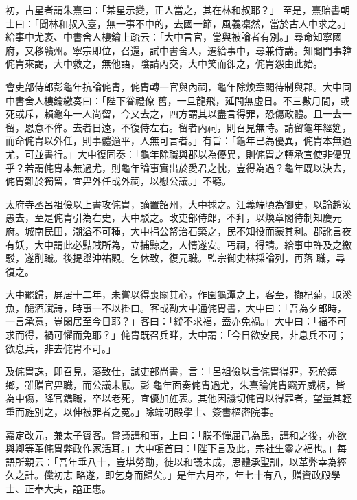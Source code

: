 \begin{pinyinscope}
 初，占星者謂朱熹曰：「某星示變，正人當之，其在林和叔耶？」
 至是，熹貽書朝士曰：「聞林和叔入臺，無一事不中的，去國一節，風義凜然，當於古人中求之。」給事中尤袤、中書舍人樓鑰上疏云：「大中言官，當與被論者有別。」尋命知寧國府，又移贛州。寧宗即位，召還，試中書舍人，遷給事中，尋兼侍講。知閣門事韓侂胄來謁，大中救之，無他語，陰請內交，大中笑而卻之，侂胄怨由此始。



 會吏部侍郎彭龜年抗論侂胄，侂胄轉一官與內祠，龜年除煥章閣待制與郡。大中同中書舍人樓鑰繳奏曰：「陛下眷禮僚
 舊，一旦龍飛，延問無虛日。不三數月間，或死或斥，賴龜年一人尚留，今又去之，四方謂其以盡言得罪，恐傷政體。且一去一留，恩意不侔。去者日遠，不復侍左右。留者內祠，則召見無時。請留龜年經筵，而命侂胄以外任，則事體適平，人無可言者。」有旨：「龜年已為優異，侂胄本無過尤，可並書行。」大中復同奏：「龜年除職與郡以為優異，則侂胄之轉承宣使非優異乎？若謂侂胄本無過尤，則龜年論事實出於愛君之忱，豈得為過？龜年既以決去，
 侂胄難於獨留，宜畀外任或外祠，以慰公議。」不聽。



 太府寺丞呂祖儉以上書攻侂胄，謫置韶州，大中捄之。汪義端頃為御史，以論趙汝愚去，至是侂胄引為右史，大中駁之。改吏部侍郎，不拜，以煥章閣待制知慶元府。城南民田，潮溢不可種，大中捐公帑治石築之，民不知役而蒙其利。郡訛言夜有妖，大中謂此必黠賊所為，立捕黥之，人情遂安。丐祠，得請。給事中許及之繳駁，遂削職。後提舉沖祐觀。乞休致，復元職。監宗御史林採論列，再落
 職，尋復之。



 大中罷歸，屏居十二年，未嘗以得喪關其心，作園龜潭之上，客至，擷杞菊，取溪魚，觴酒賦詩，時事一不以掛口。客或勸大中通侂胄書，大中曰：「吾為夕郎時，一言承意，豈閑居至今日耶？」客曰：「縱不求福，盍亦免禍。」大中曰：「福不可求而得，禍可懼而免耶？」侂胄既召兵畔，大中謂：「今日欲安民，非息兵不可；欲息兵，非去侂胄不可。」



 及侂胄誅，即召見，落致仕，試吏部尚書，言：「呂祖儉以言侂胄得罪，死於瘴鄉，雖贈官畀職，而公議未厭。彭
 龜年面奏侂胄過尤，朱熹論侂胄竊弄威柄，皆為中傷，降官鐫職，卒以老死，宜優加旌表。其他因譏切侂胄以得罪者，望量其輕重而旌別之，以伸被罪者之冤。」除端明殿學士、簽書樞密院事。



 嘉定改元，兼太子賓客。嘗議講和事，上曰：「朕不憚屈己為民，講和之後，亦欲與卿等革侂胄弊政作家活耳。」大中頓首曰：「陛下言及此，宗社生靈之福也。」每語所親云：「吾年垂八十，豈堪勞勩，徒以和議未成，思體承聖訓，以革弊幸為經久之計。儻初志
 略遂，即乞身而歸矣。」是年六月卒，年七十有八，贈資政殿學士、正奉大夫，謚正惠。




\end{pinyinscope}
